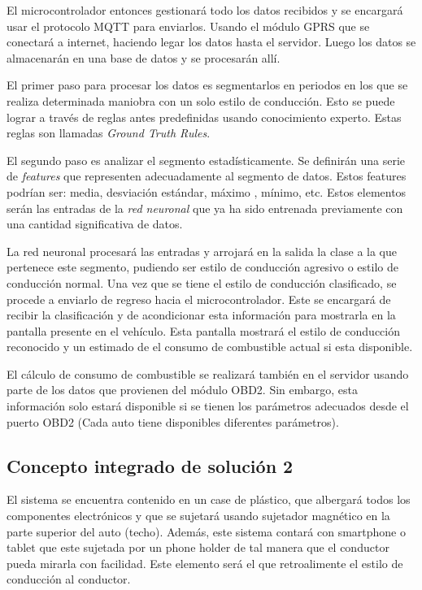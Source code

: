 El microcontrolador entonces gestionará todo los datos recibidos y se encargará usar el protocolo MQTT para enviarlos. Usando el módulo GPRS que se conectará a internet, haciendo legar los datos hasta el servidor. Luego los datos se almacenarán en una base de datos y se procesarán allí.

El primer paso para procesar los datos es segmentarlos en periodos en los que se realiza determinada maniobra con un solo estilo de conducción. Esto se puede lograr a través de reglas antes predefinidas usando conocimiento experto. Estas reglas son llamadas {\it Ground Truth Rules}.

El segundo paso es analizar el segmento estadísticamente. Se definirán una serie de {\it features} que representen adecuadamente al segmento de datos. Estos features podrían ser: media, desviación estándar, máximo , mínimo, etc. Estos elementos serán las entradas de la {\it red neuronal} que ya ha sido entrenada previamente con una cantidad significativa de datos.

La red neuronal procesará las entradas y arrojará en la salida la clase a la que pertenece este segmento, pudiendo ser estilo de conducción agresivo o estilo de conducción normal. Una vez que se tiene el estilo de conducción clasificado, se procede a enviarlo de regreso hacia el microcontrolador. Este se encargará de recibir la clasificación y de acondicionar esta información para mostrarla en la pantalla presente en el vehículo. Esta pantalla mostrará el estilo de conducción reconocido y un estimado de el consumo de combustible actual si esta disponible.

El cálculo de consumo de combustible se realizará también en el servidor usando parte de los datos que provienen del módulo OBD2. Sin embargo,  esta información solo estará disponible si se tienen los parámetros adecuados desde el puerto OBD2 (Cada auto tiene disponibles diferentes parámetros).

\subsection{Concepto integrado de solución 2}
El sistema se encuentra contenido en un case de plástico, que albergará todos los componentes electrónicos y que se sujetará usando sujetador magnético en la parte superior del auto (techo). Además, este sistema contará con smartphone o tablet que este sujetada por un phone holder de tal manera que el conductor pueda mirarla con facilidad. Este elemento será el que retroalimente el estilo de conducción al conductor.

